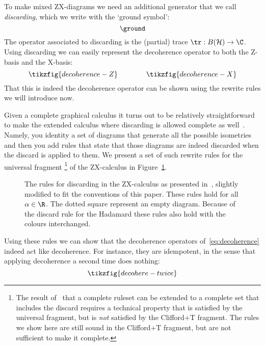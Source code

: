 \documentclass[a4paper,onecolumn,superscriptaddress,11pt,%
				unpublished,%
				allowfontchageintitle,%
				]{quantumarticle}
\begin{document}
To make mixed ZX-diagrams we need an additional generator that we call \emph{discarding}, which we write with the `ground symbol':
\begin{equation}\label{eq:ground}
	\ground
\end{equation}
The operator associated to discarding is the (partial) trace $\tr: B(\mathcal H) \rightarrow \C$.
Using discarding we can easily represent the decoherence operator to both the Z-basis and the X-basis:
\begin{equation}\label{eq:decoherence}
	\tikzfig{decoherence-Z} \qquad \qquad \tikzfig{decoherence-X}
\end{equation}
That this is indeed the decoherence operator can be shown using the rewrite rules we will introduce now.

Given a complete graphical calculus it turns out to be relatively straightforward to make the extended calculus where discarding is allowed complete as well~\cite{carette_completeness_2019}. Namely, you identity a set of diagrams that generate all the possible isometries and then you add rules that state that those diagrams are indeed discarded when the discard is applied to them.
We present a set of such rewrite rules for the universal fragment%
\footnote{The result of~\cite{carette_completeness_2019} that a complete ruleset can be extended to a complete set that includes the discard requires a technical property that is satisfied by the universal fragment, but is \emph{not} satisfied by the Clifford+T fragment. The rules we show here are still sound in the Clifford+T fragment, but are not sufficient to make it complete.} 
of the ZX-calculus in Figure~\ref{fig:discard-rules}.

\begin{figure}%
\centering
{}
\caption[Rules for the discard generator in the ZX-calculus]{%
	The rules for discarding in the ZX-calculus as presented 
	in~\cite{carette_completeness_2019}, slightly modified to fit the conventions of this paper.
	These rules hold for all $\alpha\in \R$. The dotted square represent an empty diagram. Because of the discard rule for the Hadamard these rules also hold with the colours interchanged.
}
\label{fig:discard-rules}
\end{figure}

Using these rules we can show that the decoherence operators of~\eqref{eq:decoherence} indeed act like decoherence. For instance, they are idempotent, in the sense that applying decoherence a second time does nothing:
\begin{equation}
	\tikzfig{decohere-twice}
\end{equation}
\end{document}

